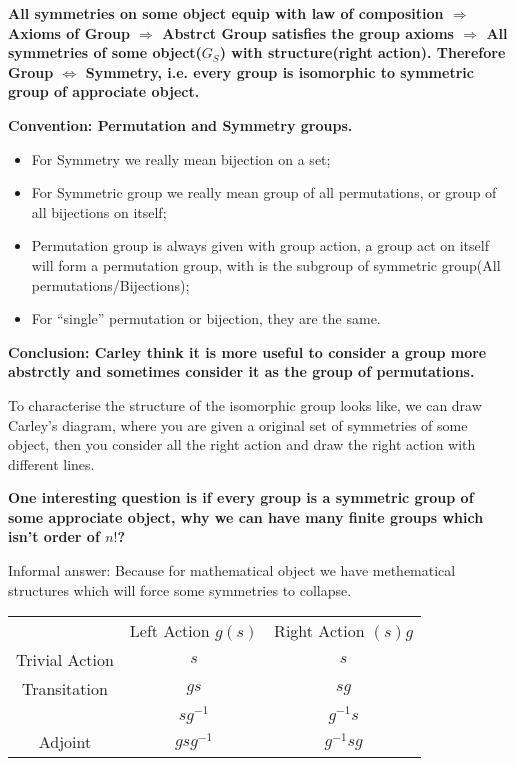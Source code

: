 \documentclass[11pt]{article}
\begin{document}
\textbf{All symmetries on some object equip with law of composition \(\Rightarrow\) Axioms of Group \(\Rightarrow\) Abstrct Group satisfies the group axioms \(\Rightarrow\) All symmetries of some object(\(G_S\)) with structure(right action). Therefore Group \(\Leftrightarrow\) Symmetry, i.e. every group is isomorphic to symmetric group of approciate object.}

\textbf{Convention: Permutation and Symmetry groups.}
\begin{itemize}
\item For Symmetry we really mean bijection on a set;
\item For Symmetric group we really mean group of all permutations, or group of all bijections on itself;
\item Permutation group is always given with group action, a group act on itself will form a permutation group, with is the subgroup of symmetric group(All permutations/Bijections);
\item For ``single'' permutation or bijection, they are the same.
\end{itemize}

\textbf{Conclusion: Carley think it is more useful to consider a group more abstrctly and sometimes consider it as the group of permutations.}

To characterise the structure of the isomorphic group looks like, we can draw Carley's diagram, where you are given a original set of symmetries of some object, then you consider all the right action and draw the right action with different lines.

\textbf{One interesting question is if every group is a symmetric group of some approciate object, why we can have many finite groups which isn't order of \(n!\)?}

Informal answer: Because for mathematical object we have methematical structures which will force some symmetries to collapse.

\begin{proposition}
\begin{center}
\begin{tabular}{ccc}
& Left Action \(g(s)\) & Right Action \((s)g\) \\
Trivial Action & \(s\) & \(s\) \\
Transitation & \(gs\) & \(sg\) \\
& \(sg^{-1}\) & \(g^{-1}s\) \\
Adjoint & \(gsg^{-1}\) & \(g^{-1}sg\)
\end{tabular}
\end{center}
\end{proposition}
\end{document}
